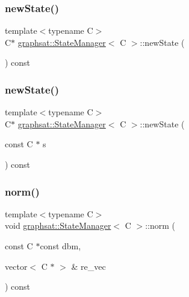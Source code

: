 \subsubsection{\texorpdfstring{newState()}{newState()}\hspace{0.1cm}{\footnotesize\ttfamily [1/2]}}
{\footnotesize\ttfamily template$<$typename C$>$ \\
C$\ast$ \mbox{\hyperlink{classgraphsat_1_1_state_manager}{graphsat\+::\+State\+Manager}}$<$ C $>$\+::new\+State (\begin{DoxyParamCaption}{ }\end{DoxyParamCaption}) const\hspace{0.3cm}{\ttfamily [inline]}}

\mbox{\label{classgraphsat_1_1_state_manager_a1e78cc01ba4268b45b801bfddd4303d4}} 
\subsubsection{\texorpdfstring{newState()}{newState()}\hspace{0.1cm}{\footnotesize\ttfamily [2/2]}}
{\footnotesize\ttfamily template$<$typename C$>$ \\
C$\ast$ \mbox{\hyperlink{classgraphsat_1_1_state_manager}{graphsat\+::\+State\+Manager}}$<$ C $>$\+::new\+State (\begin{DoxyParamCaption}\item[{const C $\ast$}]{s }\end{DoxyParamCaption}) const\hspace{0.3cm}{\ttfamily [inline]}}

\mbox{\label{classgraphsat_1_1_state_manager_a90ee05382b4da75dac3889e744ee444f}} 
\subsubsection{\texorpdfstring{norm()}{norm()}\hspace{0.1cm}{\footnotesize\ttfamily [1/2]}}
{\footnotesize\ttfamily template$<$typename C$>$ \\
void \mbox{\hyperlink{classgraphsat_1_1_state_manager}{graphsat\+::\+State\+Manager}}$<$ C $>$\+::norm (\begin{DoxyParamCaption}\item[{const C $\ast$const}]{dbm,  }\item[{vector$<$ C $\ast$ $>$ \&}]{re\+\_\+vec }\end{DoxyParamCaption}) const\hspace{0.3cm}{\ttfamily [inline]}}

